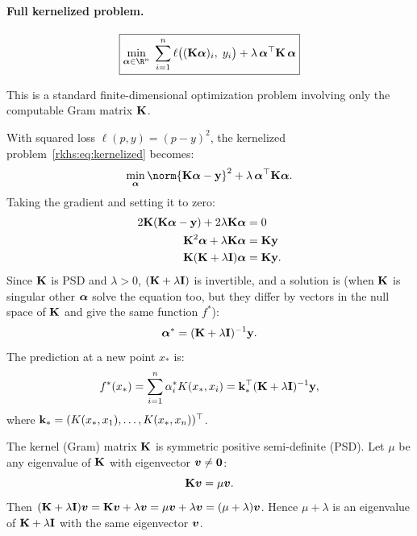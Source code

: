\begin{notechapter}
\paragraph{Full kernelized problem.}
\begin{equation}
\label{rkhs:eq:kernelized}
\boxed{\min_{\vect{\alpha} \in \R^n}\; \sum_{i=1}^n \ell\bigl((\mat{K}\vect{\alpha})_i,\; y_i\bigr) + \lambda\, \vect{\alpha}^\top \mat{K}\, \vect{\alpha}}
\end{equation}

This is a standard finite-dimensional optimization problem involving
only the computable Gram matrix $\mathbf{K}$.

\begin{example}
With squared loss $\ell(p, y) = (p - y)^2$, the kernelized
problem~\eqref{rkhs:eq:kernelized} becomes:
\[
\min_{\vect{\alpha}} \norm{\mat{K}\vect{\alpha} - \mat{y}}^2 + \lambda\,
\vect{\alpha}^\top \mat{K} \vect{\alpha}.
\]
Taking the gradient and setting it to zero:
\begin{align*}
2\mathbf{K}(\mathbf{K}\boldsymbol{\alpha} - \mathbf{y}) + 2\lambda\mathbf{K}\boldsymbol{\alpha} &= 0 \\
\mathbf{K}^2\boldsymbol{\alpha} + \lambda\mathbf{K}\boldsymbol{\alpha} &= \mathbf{K}\mathbf{y} \\
\mathbf{K}(\mathbf{K} + \lambda \mathbf{I})\boldsymbol{\alpha} &= \mathbf{K}\mathbf{y}.
\end{align*}
Since $\mathbf{K}$ is PSD and $\lambda > 0$, $(\mathbf{K} +
\lambda\mathbf{I})$ is invertible, and a solution is (when $\mathbf{K}$ is singular other $\boldsymbol{\alpha}$ solve the equation too, but they differ by vectors in the null space of $\mathbf{K}$ and give the same function $f^*$):
\[
\boldsymbol{\alpha}^* = (\mathbf{K} + \lambda\mathbf{I})^{-1}\mathbf{y}.
\]
The prediction at a new point $x_*$ is:
\[
f^*(x_*) = \sum_{i=1}^n \alpha_i^* K(x_*, x_i) = \mathbf{k}_*^\top (\mathbf{K}
+ \lambda\mathbf{I})^{-1}\mathbf{y},
\]
where $\mathbf{k}_* = (K(x_*, x_1), \ldots, K(x_*, x_n))^\top$.
\end{example}

\begin{intuition}
The kernel (Gram) matrix $\mathbf{K}$ is symmetric positive semi-definite (PSD).
Let $\mu$ be any eigenvalue of $\mathbf{K}$ with eigenvector $\boldsymbol{v} \neq \boldsymbol{0}$:
\[
\mathbf{K}\boldsymbol{v} = \mu \boldsymbol{v}.
\]
Then $(\mathbf{K} + \lambda\mathbf{I})\boldsymbol{v} = \mathbf{K}\boldsymbol{v} + \lambda\boldsymbol{v}
= \mu\boldsymbol{v} + \lambda\boldsymbol{v} = (\mu + \lambda)\boldsymbol{v}$.
Hence $\mu + \lambda$ is an eigenvalue of $\mathbf{K} + \lambda\mathbf{I}$
with the same eigenvector $\boldsymbol{v}$.


\end{intuition}
\end{notechapter}
